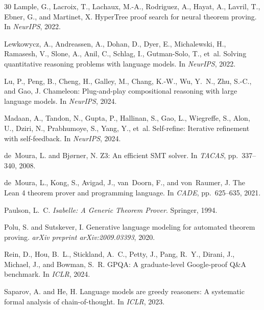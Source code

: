 \documentclass[11pt,a4paper]{article}
\begin{document}
\begin{thebibliography}{30}
Lample, G., Lacroix, T., Lachaux, M.-A., Rodriguez, A., Hayat, A., Lavril, T., Ebner, G., and Martinet, X.
\newblock HyperTree proof search for neural theorem proving.
\newblock In \emph{NeurIPS}, 2022.

Lewkowycz, A., Andreassen, A., Dohan, D., Dyer, E., Michalewski, H., Ramasesh, V., Slone, A., Anil, C., Schlag, I., Gutman-Solo, T., et~al.
\newblock Solving quantitative reasoning problems with language models.
\newblock In \emph{NeurIPS}, 2022.

Lu, P., Peng, B., Cheng, H., Galley, M., Chang, K.-W., Wu, Y.~N., Zhu, S.-C., and Gao, J.
\newblock Chameleon: Plug-and-play compositional reasoning with large language models.
\newblock In \emph{NeurIPS}, 2024.

Madaan, A., Tandon, N., Gupta, P., Hallinan, S., Gao, L., Wiegreffe, S., Alon, U., Dziri, N., Prabhumoye, S., Yang, Y., et~al.
\newblock Self-refine: Iterative refinement with self-feedback.
\newblock In \emph{NeurIPS}, 2024.

de~Moura, L. and Bj{\o}rner, N.
\newblock Z3: An efficient SMT solver.
\newblock In \emph{TACAS}, pp.\ 337--340, 2008.

de~Moura, L., Kong, S., Avigad, J., van~Doorn, F., and von~Raumer, J.
\newblock The Lean 4 theorem prover and programming language.
\newblock In \emph{CADE}, pp.\ 625--635, 2021.

Paulson, L.~C.
\newblock \emph{Isabelle: A Generic Theorem Prover}.
\newblock Springer, 1994.

Polu, S. and Sutskever, I.
\newblock Generative language modeling for automated theorem proving.
\newblock \emph{arXiv preprint arXiv:2009.03393}, 2020.

Rein, D., Hou, B.~L., Stickland, A.~C., Petty, J., Pang, R.~Y., Dirani, J., Michael, J., and Bowman, S.~R.
\newblock GPQA: A graduate-level Google-proof Q\&A benchmark.
\newblock In \emph{ICLR}, 2024.

Saparov, A. and He, H.
\newblock Language models are greedy reasoners: A systematic formal analysis of chain-of-thought.
\newblock In \emph{ICLR}, 2023.


\end{thebibliography}
\end{document}
